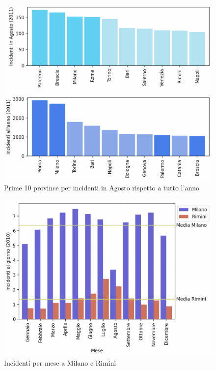 \documentclass[a4paper]{report}
\begin{document}
\begin{figure}
    \includegraphics[width=\linewidth]{../src/incidenti/incidenti_senza_coords/mese_incidenti/mesi_estivi.png}
    \caption{Prime 10 province per incidenti in Agosto rispetto a tutto l'anno}
    \label{fig:mesi-estivi}
\end{figure}

\begin{figure}
    \includegraphics[width=\linewidth]{../src/incidenti/incidenti_senza_coords/mese_incidenti/milano_rimini.png}
    \caption{Incidenti per mese a Milano e Rimini}
    \label{fig:milano-rimini}
\end{figure}
\end{document}
